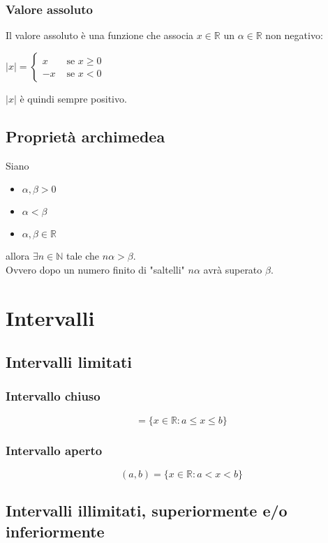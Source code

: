 \documentclass[a4paper,12pt, oneside]{book}
\begin{document}
\subsubsection{Valore assoluto}
Il valore assoluto è una funzione che associa $x\in\mathbb{R}$ un $\alpha\in\mathbb{R}$ non negativo:
\begin{center}
	$|x|=\left\{
		\begin{array}{ll}
			x  & \mbox{ se } x\geq0 \\
			-x & \mbox{ se } x<0
		\end{array}
		\right.$
\end{center}
$|x|$ è quindi sempre positivo.
\subsection{Proprietà archimedea}
\begin{teorema}
	Siano
	\begin{itemize}
		\item $\alpha,\beta>0$
		\item $\alpha<\beta$
		\item $\alpha,\beta \in \mathbb{R}$
	\end{itemize}
	allora $\exists n \in \mathbb{N}$ tale che $n\alpha>\beta$.\\
	Ovvero dopo un numero finito di "saltelli" $n\alpha$ avrà superato $\beta$.
\end{teorema}
\newpage
\section{Intervalli}
\subsection{Intervalli limitati}
\subsubsection{Intervallo chiuso}
\begin{equation}
	[a,b]=\{x\in\mathbb{R}\colon a\leq x\leq b\}
\end{equation}
\subsubsection{Intervallo aperto}
\begin{equation}
	(a,b)=\{x\in\mathbb{R}\colon a<x<b\}
\end{equation}
\subsection{Intervalli illimitati, superiormente e/o inferiormente}
\end{document}
